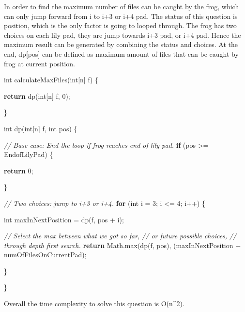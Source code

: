 \documentclass[
]{article}
\author{}
\date{}
\newenvironment{Shaded}{}{}
\newcommand{\BuiltInTok}[1]{#1}
\newcommand{\CommentTok}[1]{\textcolor[rgb]{0.38,0.63,0.69}{\textit{#1}}}
\newcommand{\ControlFlowTok}[1]{\textcolor[rgb]{0.00,0.44,0.13}{\textbf{#1}}}
\newcommand{\DataTypeTok}[1]{\textcolor[rgb]{0.56,0.13,0.00}{#1}}
\newcommand{\DecValTok}[1]{\textcolor[rgb]{0.25,0.63,0.44}{#1}}
\newcommand{\FunctionTok}[1]{\textcolor[rgb]{0.02,0.16,0.49}{#1}}
\newcommand{\NormalTok}[1]{#1}
\newcommand{\OperatorTok}[1]{\textcolor[rgb]{0.40,0.40,0.40}{#1}}
\begin{document}
In order to find the maximum number of files can be caught by the frog,
which can only jump forward from i to i+3 or i+4 pad. The status of this
question is position, which is the only factor is going to looped
through. The frog has two choices on each lily pad, they are jump
towards i+3 pad, or i+4 pad. Hence the maximum result can be generated
by combining the status and choices. At the end, dp{[}pos{]} can be
defined as maximum amount of files that can be caught by frog at current
position.

\begin{Shaded}
\begin{Highlighting}[]
\DataTypeTok{int} \FunctionTok{calculateMaxFiles}\OperatorTok{(}\DataTypeTok{int}\OperatorTok{[}\NormalTok{n}\OperatorTok{]}\NormalTok{ f}\OperatorTok{)} \OperatorTok{\{}

    \ControlFlowTok{return} \FunctionTok{dp}\OperatorTok{(}\DataTypeTok{int}\OperatorTok{[}\NormalTok{n}\OperatorTok{]}\NormalTok{ f}\OperatorTok{,} \DecValTok{0}\OperatorTok{);}

\OperatorTok{\}}

\DataTypeTok{int} \FunctionTok{dp}\OperatorTok{(}\DataTypeTok{int}\OperatorTok{[}\NormalTok{n}\OperatorTok{]}\NormalTok{ f}\OperatorTok{,} \DataTypeTok{int}\NormalTok{ pos}\OperatorTok{)} \OperatorTok{\{}

    \CommentTok{// Base case: End the loop if frog reaches end of lily pad.
}
    \ControlFlowTok{if} \OperatorTok{(}\NormalTok{pos }\OperatorTok{\textgreater{}=}\NormalTok{ EndofLilyPad}\OperatorTok{)} \OperatorTok{\{}

        \ControlFlowTok{return} \DecValTok{0}\OperatorTok{;}

    \OperatorTok{\}}

    \CommentTok{// Two choices: jump to i+3 or i+4.
}
    \ControlFlowTok{for} \OperatorTok{(}\DataTypeTok{int}\NormalTok{ i }\OperatorTok{=} \DecValTok{3}\OperatorTok{;}\NormalTok{ i }\OperatorTok{\textless{}=} \DecValTok{4}\OperatorTok{;}\NormalTok{ i}\OperatorTok{++)} \OperatorTok{\{}

        \DataTypeTok{int}\NormalTok{ maxInNextPosition }\OperatorTok{=} \FunctionTok{dp}\OperatorTok{(}\NormalTok{f}\OperatorTok{,}\NormalTok{ pos }\OperatorTok{+}\NormalTok{ i}\OperatorTok{);}

        \CommentTok{// Select the max between what we got so far,
}
        \CommentTok{// or future possible choices,
}
        \CommentTok{// through depth first search.
}
        \ControlFlowTok{return} \BuiltInTok{Math}\OperatorTok{.}\FunctionTok{max}\OperatorTok{(}\FunctionTok{dp}\OperatorTok{(}\NormalTok{f}\OperatorTok{,}\NormalTok{ pos}\OperatorTok{),} \OperatorTok{(}\NormalTok{maxInNextPosition }\OperatorTok{+}\NormalTok{ numOfFilesOnCurrentPad}\OperatorTok{);}

    \OperatorTok{\}}

\OperatorTok{\}}
\end{Highlighting}
\end{Shaded}

Overall the time complexity to solve this question is O(n\^{}2).
\end{document}
